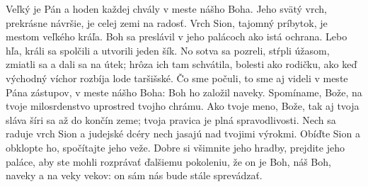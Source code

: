 Veľký je Pán a hoden každej chvály
v meste nášho Boha.
\versseparator
Jeho svätý vrch, prekrásne návršie, je celej zemi na radosť.
Vrch Sion, tajomný príbytok,
je mestom veľkého kráľa.
\versseparator
Boh sa preslávil v jeho palácoch
ako istá ochrana.
\versseparator
Lebo hľa, králi sa spolčili
a utvorili jeden šík.
\versseparator
No sotva sa pozreli, stŕpli úžasom,
zmiatli sa a dali sa na útek;
hrôza ich tam schvátila,
\versseparator
bolesti ako rodičku,
ako keď východný víchor
rozbíja lode taršišské.
\versseparator
Čo sme počuli, to sme aj videli
v meste Pána zástupov,
v meste nášho Boha:
Boh ho založil naveky.
\versseparator
Spomíname, Bože, na tvoje milosrdenstvo
uprostred tvojho chrámu.
\versseparator
Ako tvoje meno, Bože,
tak aj tvoja sláva šíri sa až do končín zeme;
tvoja pravica je plná spravodlivosti.
\versseparator
Nech sa raduje vrch Sion a judejské dcéry nech jasajú
nad tvojimi výrokmi.
\versseparator
Obíďte Sion a obklopte ho,
spočítajte jeho veže.
\versseparator
Dobre si všimnite jeho hradby,
prejdite jeho paláce,
aby ste mohli rozprávať ďalšiemu pokoleniu,
\versseparator
že on je Boh, náš Boh,
naveky a na veky vekov:
on sám nás bude stále sprevádzať.